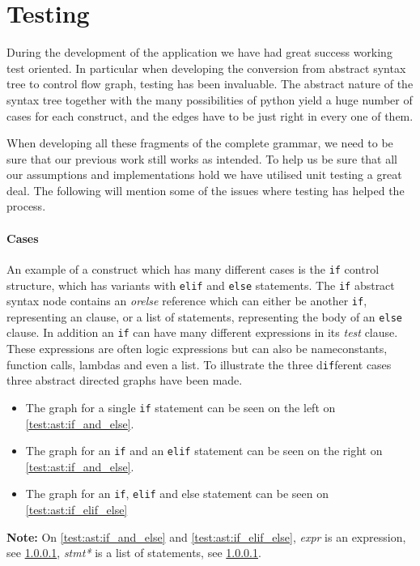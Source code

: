 \section{Testing}
During the development of the application we have had great success working test oriented.
In particular when developing the conversion from abstract syntax tree to control flow graph, testing has been invaluable.
The abstract nature of the syntax tree together with the many possibilities of python yield a huge number of cases for each construct, and the edges have to be just right in every one of them.

When developing all these fragments of the complete grammar, we need to be sure that our previous work still works as intended.
To help us be sure that all our assumptions and implementations hold we have utilised unit testing a great deal.
The following will mention some of the issues where testing has helped the process.

\paragraph{Cases}
An example of a construct which has many different cases is the \texttt{if} control structure, which has variants with \texttt{elif} and \texttt{else} statements.
The \texttt{if} abstract syntax node contains an \emph{orelse} reference which can either be another \texttt{if}, representing an  clause, or a list of statements, representing the body of an \texttt{else} clause.
In addition an \texttt{if} can have many different expressions in its \emph{test} clause.
These expressions are often logic expressions but can also be nameconstants, function calls, lambdas and even a list.
To illustrate the three d\texttt{if}ferent cases three abstract directed graphs have been made.
\begin{itemize}
\item The graph for a single \texttt{if} statement can be seen on the left on \cref{test:ast:if_and_else}.
\item The graph for an \texttt{if} and an \texttt{elif} statement can be seen on the right on \cref{test:ast:if_and_else}.
\item The graph for an \texttt{if}, \texttt{elif} and else statement can be seen on \cref{test:ast:if_elif_else}
\end{itemize}
\textbf{Note:} On \cref{test:ast:if_and_else} and \cref{test:ast:if_elif_else}, \textit{expr} is an expression, see \cref{}, \textit{stmt*} is a list of statements, see \cref{}.


